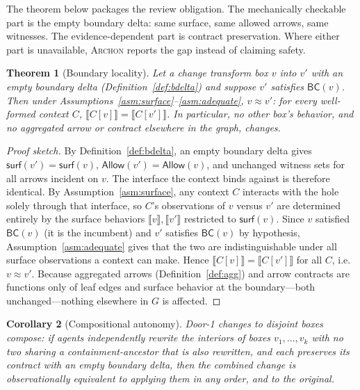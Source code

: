 \documentclass[sigconf,review,anonymous]{acmart}
\theoremstyle{plain}
\newtheorem{theorem}{Theorem}[section]
\newtheorem{corollary}[theorem]{Corollary}
\theoremstyle{definition}
\begin{document}
The theorem below packages the review obligation. The mechanically checkable
part is the empty boundary delta: same surface, same allowed arrows, same
witnesses. The evidence-dependent part is contract preservation. Where either
part is unavailable, \textsc{Archon} reports the gap instead of claiming safety.

\begin{theorem}[Boundary locality]\label{thm:locality}
Let a change transform box $v$ into $v'$ with an \emph{empty boundary delta}
(Definition~\ref{def:bdelta}) and suppose $v'$ satisfies $\mathsf{BC}(v)$. Then
under Assumptions~\ref{asm:surface}--\ref{asm:adequate}, $v \approx v'$: for
every well-formed context $C$, $\llbracket C[v] \rrbracket = \llbracket C[v']
\rrbracket$. In particular, no other box's behavior, and no aggregated arrow or
contract elsewhere in the graph, changes.
\end{theorem}

\begin{proof}[Proof sketch]
By Definition~\ref{def:bdelta}, an empty boundary delta gives
$\mathsf{surf}(v') = \mathsf{surf}(v)$, $\mathsf{Allow}(v')=\mathsf{Allow}(v)$,
and unchanged witness sets for all arrows incident on $v$. The interface the
context binds against is therefore identical. By Assumption~\ref{asm:surface}, any
context $C$ interacts with the hole solely through that interface, so $C$'s
observations of $v$ versus $v'$ are determined entirely by the surface
behaviors $\llbracket v\rrbracket,\llbracket v'\rrbracket$ restricted to
$\mathsf{surf}(v)$. Since $v$ satisfied $\mathsf{BC}(v)$ (it is the incumbent)
and $v'$ satisfies $\mathsf{BC}(v)$ by hypothesis, Assumption~\ref{asm:adequate}
gives that the two are indistinguishable under all surface observations a
context can make. Hence $\llbracket C[v]\rrbracket = \llbracket C[v']\rrbracket$
for all $C$, i.e.\ $v\approx v'$. Because aggregated arrows
(Definition~\ref{def:agg}) and arrow contracts are functions only of leaf edges
and surface behavior at the boundary---both unchanged---nothing elsewhere in
$G$ is affected.
\end{proof}

\begin{corollary}[Compositional autonomy]\label{cor:autonomy}
Door-1 changes to \emph{disjoint} boxes compose: if agents independently rewrite
the interiors of boxes $v_1,\dots,v_k$ with no two sharing a containment-ancestor
that is also rewritten, and each preserves its contract with an empty boundary
delta, then the combined change is observationally equivalent to applying them
in any order, and to the original.
\end{corollary}
\end{document}
